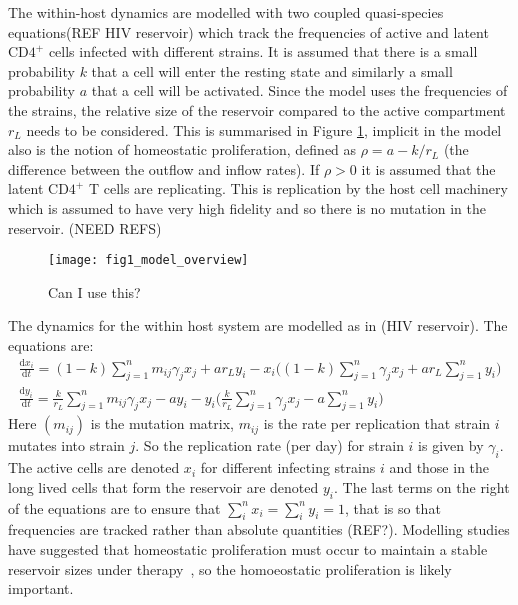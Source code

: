 \documentclass[DIV=15]{scrartcl}
\begin{document}
The within-host dynamics are modelled with two coupled quasi-species equations(REF HIV reservoir) which  track the frequencies of active and latent CD$4^+$ cells infected with different strains. It is assumed that there is a small probability $k$ that  a cell will enter the resting state and similarly a small probability $a$  that a cell will  be activated. Since the model uses the frequencies of the strains, the relative size of the reservoir compared to the active compartment $r_L$ needs to be considered. This is summarised in Figure \ref{Within Host Diagram}, implicit in the model also is  the notion of homeostatic proliferation, defined as $\rho = a - k/r_L$ (the difference between the outflow and inflow rates). If $\rho>0$
 it is assumed that
the latent CD$4^+$ T cells  are replicating. This is replication by the host cell machinery which is assumed  to have very high fidelity and so there is no mutation in the reservoir. (NEED REFS)
\begin{figure}[h]
 \begin{center}
 \texttt{[image: fig1\_model\_overview]}
 \end{center}
 \caption{Can I use this?}
 \label{Within Host Diagram}
 \end{figure}
 
  The dynamics for the within host system  are modelled as in (HIV reservoir). The equations are:
 \begin{gather*}
\frac{\text{d} x_i}{\text{d} t} = (1-k) \sum_{j=1}^n m_{ij} \gamma_j x_j + a r_L y_i - x_i\bigg((1-k) \sum_{j=1}^n  \gamma_j x_j + ar_L \sum_{j=1}^n y_i \bigg)  \\
\frac{\text{d} y_i}{\text{d} t} = \frac{k}{r_L} \sum_{j=1}^n m_{ij} \gamma_j x_j - a y_i - y_i\bigg(\frac{k}{r_L} \sum_{j=1}^n  \gamma_j x_j - a \sum_{j=1}^n y_i \bigg) 
\end{gather*} 
Here $(m_{ij})$ is the mutation matrix, $m_{ij}$ is the rate per replication  that strain $i$ mutates into strain $j$. So the replication rate (per day)  for strain $i$ is given by $ \gamma_i$. The  active cells are denoted $ x_i$ for different infecting strains $i$  and those in the  long lived cells that form the reservoir are denoted $y_i$.  The last  terms on the right of the equations are to ensure that  $ \sum_i^n x_i = \sum_i^n y_i = 1$, that is so that frequencies are tracked rather than absolute quantities (REF?). Modelling studies have suggested that homeostatic proliferation must occur to maintain a stable reservoir sizes under therapy~\cite{kim2006,rong2009}, so the homoeostatic proliferation is likely important.
\end{document}
